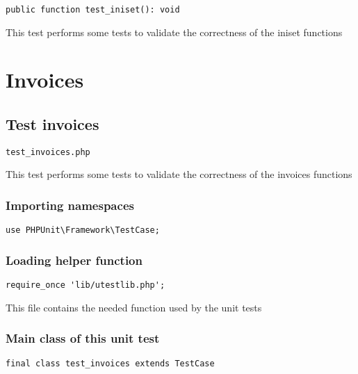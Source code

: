 \documentclass[a4paper]{article}
\begin{document}
\begin{lstlisting}
public function test_iniset(): void
\end{lstlisting}

This test performs some tests to validate the correctness
of the iniset functions


\hypertarget{toc279}{}
\section{Invoices}

\hypertarget{toc280}{}
\subsection{Test invoices}

\begin{lstlisting}
test_invoices.php
\end{lstlisting}

This test performs some tests to validate the correctness
of the invoices functions

\hypertarget{toc281}{}
\subsubsection{Importing namespaces}

\begin{lstlisting}
use PHPUnit\Framework\TestCase;
\end{lstlisting}

\hypertarget{toc282}{}
\subsubsection{Loading helper function}

\begin{lstlisting}
require_once 'lib/utestlib.php';
\end{lstlisting}

This file contains the needed function used by the unit tests

\hypertarget{toc283}{}
\subsubsection{Main class of this unit test}

\begin{lstlisting}
final class test_invoices extends TestCase
\end{lstlisting}

\hypertarget{toc284}{}
\end{document}
